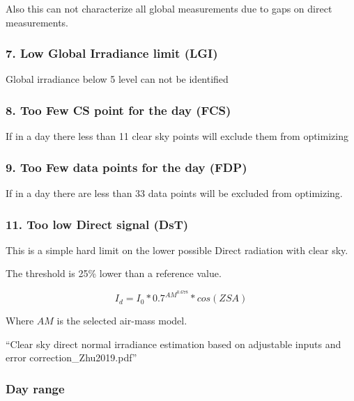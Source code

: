 \documentclass[
  10pt,
  a4paper,oneside]{article}
\begin{document}
Also this can not characterize all global measurements due to gaps on direct measurements.

\hypertarget{low-global-irradiance-limit-lgi}{%
\subsubsection{7. Low Global Irradiance limit (LGI)}\label{low-global-irradiance-limit-lgi}}

Global irradiance below 5 level can not be identified

\hypertarget{too-few-cs-point-for-the-day-fcs}{%
\subsubsection{8. Too Few CS point for the day (FCS)}\label{too-few-cs-point-for-the-day-fcs}}

If in a day there less than 11 clear sky points will exclude them from optimizing

\hypertarget{too-few-data-points-for-the-day-fdp}{%
\subsubsection{9. Too Few data points for the day (FDP)}\label{too-few-data-points-for-the-day-fdp}}

If in a day there are less than 33 data points will be excluded from optimizing.

\hypertarget{too-low-direct-signal-dst}{%
\subsubsection{11. Too low Direct signal (DsT)}\label{too-low-direct-signal-dst}}

This is a simple hard limit on the lower possible Direct radiation with clear sky.

The threshold is 25\% lower than a reference value.

\[ I_d = I_0 * 0.7^{{AM}^{0.678}} * cos({ZSA}) \]

Where \({AM}\) is the selected air-mass model.

``Clear sky direct normal irradiance estimation based on adjustable inputs and error correction\_Zhu2019.pdf''

\hypertarget{day-range}{%
\subsubsection{Day range}\label{day-range}}
\end{document}
